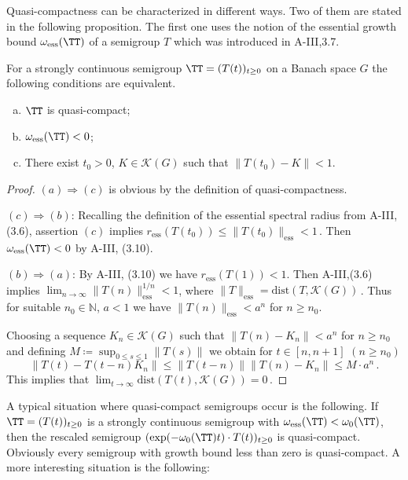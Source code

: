 Quasi-compactness can be characterized in different ways.
Two of them
are stated in the following proposition.
The first one uses the notion
of the essential growth bound $\omega_{\text{ess}}(\TT)$ of a semigroup $T$ which was
introduced in A-III,3.7.

\begin{proposition}\label{prop:b4-2.8}
	For a strongly continuous semigroup $\TT = (T(t))_{t \geq 0}$
	on a Banach space $G$ the following conditions are equivalent.
	\begin{enumerate}[(a)]
		\item
		$\TT$ is quasi-compact;
	
		\item 
		$\omega_{\text{ess}}(\TT) < 0$;
	
		\item 
		There exist $t_{0} > 0$, $K \in \mathcal{K}(G)$ such that $\|T(t_{0}) - K\| < 1$.
	\end{enumerate}
\end{proposition}
%
%
%
\newpage 
%
\begin{proof}
	$(a)\Rightarrow(c)$ is obvious by the definition of quasi-compactness.
	
	$(c)\Rightarrow(b)$: Recalling the definition of the essential spectral radius from A-III, (3.6), assertion $(c)$ implies 
	$r_{\text{ess}}(T(t_0)) \leq \|T(t_0)\|_{\text{ess}} < 1\,.$ 
	Then  $\omega_{\text{ess}}(\TT) < 0 $ by A-III, (3.10).
	
	$(b)\Rightarrow(a)$: By A-III, (3.10) we have $r_{\text{ess}}(T(1)) < 1$. Then A-III,(3.6) implies 
	$\lim_{n \to \infty}\|T(n)\|_{\text{ess}}^{1/n} < 1$,  where $\|T\|_{\text{ess}} = \mathrm{dist}(T,\mathcal{K}(G))$\,. Thus for suitable $n_{0} \in \mathbb{N}$, $a < 1$ we have $\|T(n)\|_{\text{ess}} < a^n$ for $n \geq n_{0}$.
	
	Choosing a sequence $K_n \in \mathcal{K}(G)$ such that $\|T(n) - K_n\| < a^n$ for $n \geq n_{0}$ and defining $M \coloneqq \sup_{0 \leq s \leq 1}\|T(s)\|$ we obtain for $t \in [n,n+1]$ $(n \geq n_{0})$ 
	\[
	\|T(t) - T(t-n)K_n\| \leq \|T(t-n)\|\|T(n) - K_n\| \leq M \cdot a^n\,.
	\] 
	This implies that $\lim_{t \to \infty}\mathrm{dist}(T(t),\mathcal{K}(G)) = 0\,.$
	\end{proof}
	
	A typical situation where quasi-compact semigroups occur is the following. If $\TT = (T(t))_{t \geq 0}$ is a strongly continuous semigroup with $\omega_{\text{ess}}(\TT) < \omega_{0}(\TT)$, then the rescaled semigroup $(\text{exp}(-\omega_{0}(\TT)t)\cdot T(t))_{t \geq 0}$ is quasi-compact. Obviously every semigroup with growth bound less than zero is quasi-compact. A more interesting situation is the following:
	
